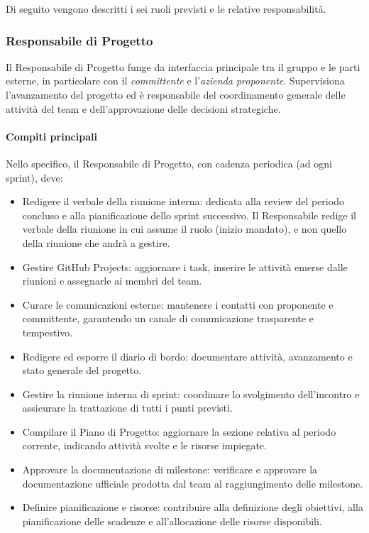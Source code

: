 \documentclass[a4paper, 11pt, oneside]{scrartcl} %
\begin{document}
Di seguito vengono descritti i sei ruoli previsti e le relative responsabilità.


\subsubsection{Responsabile di Progetto}
Il Responsabile di Progetto funge da interfaccia principale tra il gruppo e le parti esterne, in particolare con il \emph{committente}{\scriptsize{}} e l'\emph{azienda proponente}{\scriptsize{}}.
Supervisiona l’avanzamento del progetto ed è responsabile del coordinamento generale delle attività del team e dell’approvazione delle decisioni strategiche.

\paragraph{Compiti principali}
Nello specifico, il Responsabile di Progetto, con cadenza periodica (ad ogni sprint), deve:
\begin{itemize}
    \item Redigere il verbale della riunione interna: dedicata alla review del periodo concluso e alla pianificazione dello sprint successivo. Il Responsabile redige il verbale della riunione in cui assume il ruolo (inizio mandato), e non quello della riunione che andrà a gestire.
    \item Gestire GitHub Projects: aggiornare i task, inserire le attività emerse dalle riunioni e assegnarle ai membri del team.
    \item Curare le comunicazioni esterne: mantenere i contatti con proponente e committente, garantendo un canale di comunicazione trasparente e tempestivo.
    \item Redigere ed esporre il diario di bordo: documentare attività, avanzamento e stato generale del progetto.
    \item Gestire la riunione interna di sprint: coordinare lo svolgimento dell’incontro e assicurare la trattazione di tutti i punti previsti.
    \item Compilare il Piano di Progetto: aggiornare la sezione relativa al periodo corrente, indicando attività svolte e le risorse impiegate.
    \item Approvare la documentazione di milestone: verificare e approvare la documentazione ufficiale prodotta dal team al raggiungimento delle milestone.
    \item Definire pianificazione e risorse: contribuire alla definizione degli obiettivi, alla pianificazione delle scadenze e all’allocazione delle risorse disponibili.
\end{itemize}
\end{document}
